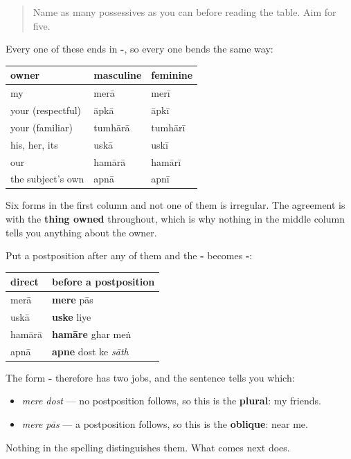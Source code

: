 \label{lesson:HI-C84-repaso-kiska}



\begin{quote}
Name as many possessives as you can before reading the table. Aim for five.
\end{quote}

\begin{grammarlens}[title={Grammar Lens: the whole grid}]
Every one of these ends in \textbf{-}, so every one bends the same way:

\noindent
\begin{tabularx}{\linewidth}{@{}>{\raggedright\arraybackslash}X>{\raggedright\arraybackslash}X>{\raggedright\arraybackslash}X@{}}
\toprule
\textbf{owner} & \textbf{masculine} & \textbf{feminine} \\
\midrule
my & merā & merī \\
your (respectful) & āpkā & āpkī \\
your (familiar) & tumhārā & tumhārī \\
his, her, its & uskā & uskī \\
our & hamārā & hamārī \\
the subject's own & apnā & apnī \\
\bottomrule
\end{tabularx}

Six forms in the first column and not one of them is irregular. The agreement is with the \textbf{thing owned} throughout, which is why nothing in the middle column tells you anything about the owner.
\end{grammarlens}

\begin{grammarlens}[title={Grammar Lens: the bend, and the two jobs of -\hi{ए}}]
Put a postposition after any of them and the \textbf{-} becomes \textbf{-}:

\noindent
\begin{tabularx}{\linewidth}{@{}>{\raggedright\arraybackslash}X>{\raggedright\arraybackslash}X@{}}
\toprule
\textbf{direct} & \textbf{before a postposition} \\
\midrule
merā & \textbf{mere} pās \\
uskā & \textbf{uske} liye \\
hamārā & \textbf{hamāre} ghar meṅ \\
apnā & \textbf{apne} dost ke \emph{sāth} \\
\bottomrule
\end{tabularx}

The form \textbf{-} therefore has two jobs, and the sentence tells you which:

\begin{itemize}
\raggedright
  \item \emph{mere dost} — no postposition follows, so this is the \textbf{plural}: my friends.
  \item \emph{mere pās} — a postposition follows, so this is the \textbf{oblique}: near me.
\end{itemize}

Nothing in the spelling distinguishes them. What comes next does.
\end{grammarlens}

